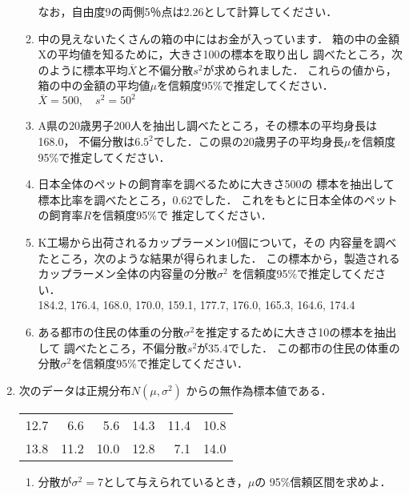 \documentclass[12pt]{ltjsarticle}
\begin{document}
\begin{enumerate}
\begin{enumerate}
なお，自由度9の両側5％点は2.26として計算してください．
\cite[p.135]{wakui}
\item
中の見えないたくさんの箱の中にはお金が入っています．
箱の中の金額Xの平均値を知るために，大きさ100の標本を取り出し
調べたところ，次のように標本平均$\overline{X}$と不偏分散$s^2$が求められました．
これらの値から，箱の中の金額の平均値$\mu$を信頼度95\%で推定してください． \\
\hspace{1cm} $\overline{X} = 500, \quad s^2=50^2$\\
\cite[p.142]{wakui}
\item
A県の20歳男子200人を抽出し調べたところ，その標本の平均身長は168.0，
不偏分散は$6.5^2$でした．この県の20歳男子の平均身長$\mu$を信頼度
95\%で推定してください．
\cite[p.142]{wakui}
\item
日本全体のペットの飼育率を調べるために大きさ500の
標本を抽出して標本比率を調べたところ，0.62でした．
これをもとに日本全体のペットの飼育率$R$を信頼度95\%で
推定してください．
\cite[p.145]{wakui}
\item
K工場から出荷されるカップラーメン10個について，その
内容量を調べたところ，次のような結果が得られました．
この標本から，製造されるカップラーメン全体の内容量の分散$\sigma^2$
を信頼度95\%で推定してください．\\
\hspace{1cm} 184.2, 176.4, 168.0, 170.0, 159.1,
177.7, 176.0, 165.3, 164.6, 174.4 \\
\cite[p.147]{wakui}
\item
ある都市の住民の体重の分散$\sigma^2$を推定するために大きさ10の標本を抽出して
調べたところ，不偏分散$s^2$が35.4でした．
この都市の住民の体重の分散$\sigma^2$を信頼度95\%で推定してください．
\cite[p.149]{wakui}
\end{enumerate}
\item
次のデータは正規分布$N\left(\mu, \sigma^2\right)$
からの無作為標本値である．\cite[p.164]{inagaki}
\begin{table}[h]
\begin{center}
\begin{tabular}{rrrrrr}
12.7& 6.6& 5.6& 14.3& 11.4& 10.8 \\
13.8& 11.2& 10.0& 12.8& 7.1& 14.0
\end{tabular}
\end{center}
\end{table}
\begin{enumerate}
\item 分散が$\sigma^2=7$として与えられているとき，$\mu$の
95\%信頼区間を求めよ．

\end{enumerate}
\end{enumerate}
\end{document}
